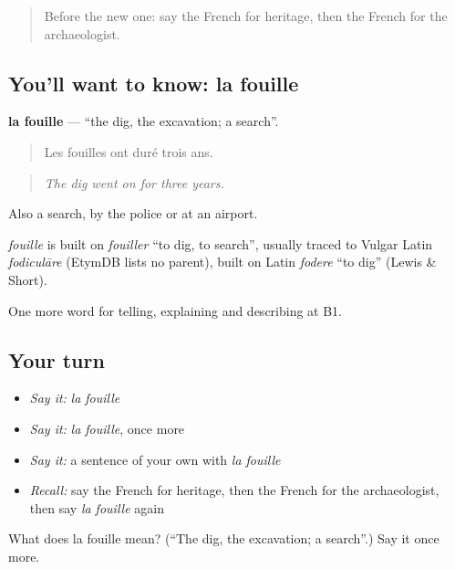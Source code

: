\label{lesson:FR-C325-fouille}



\begin{quote}
Before the new one: say the French for heritage, then the French for the archaeologist.
\end{quote}

\subsection*{You'll want to know: la fouille}
\textbf{la fouille} — \textquotedblleft{}the dig, the excavation; a search\textquotedblright{}.

\begin{quote}
Les fouilles ont duré trois ans.
\end{quote}

\begin{quote}
\emph{The dig went on for three years.}
\end{quote}

Also a search, by the police or at an airport.

\begin{cousinweb}
\emph{fouille} is built on \emph{fouiller} \textquotedblleft{}to dig, to search\textquotedblright{}, usually traced to Vulgar Latin \emph{fodiculāre} (EtymDB lists no parent), built on Latin \emph{fodere} \textquotedblleft{}to dig\textquotedblright{} (Lewis \& Short).
\end{cousinweb}

\begin{grammarlens}[title={What you've built}]
One more word for telling, explaining and describing at B1.
\end{grammarlens}

\subsection*{Your turn}
\begin{itemize}
\raggedright
  \item \emph{Say it:} \emph{la fouille}
  \item \emph{Say it:} \emph{la fouille}, once more
  \item \emph{Say it:} a sentence of your own with \emph{la fouille}
  \item \emph{Recall:} say the French for heritage, then the French for the archaeologist, then say \emph{la fouille} again
\end{itemize}

\begin{tcolorbox}[breakable,colback=teal!4,colframe=teal!35!black,title={Before you move on}]
What does la fouille mean? (\textquotedblleft{}The dig, the excavation; a search\textquotedblright{}.) Say it once more.
\end{tcolorbox}
